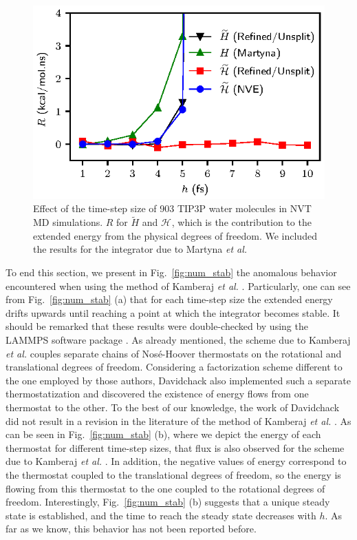 \documentclass[
journal=jctcce,
layout=twocolumn
]{achemso}
\newcommand{\Ham}[1]{{\mathcal H}_\text{#1}}    %
\begin{document}
\begin{figure}
	\includegraphics{Figures/energy_drift.eps}
    \caption{Effect of the time-step size of 903 TIP3P \cite{Jorgensen_1983} water molecules in NVT MD simulations. $R$ for $\widetilde{H}$ and $\Ham{}$, which is the contribution to the extended energy from the physical degrees of freedom. We included the results for the integrator due to Martyna \textit{et al.} \cite{Martyna_1996}
}
	\label{fig:energy_drift}
\end{figure}

To end this section, we present in Fig.~\ref{fig:num_stab} the anomalous behavior encountered when using the method of Kamberaj \textit{et al.} \cite{Kamberaj_2005}.
Particularly, one can see from Fig.~\ref{fig:num_stab} (a) that for each time-step size the extended energy drifts upwards until reaching a point at which the integrator becomes stable.
It should be remarked that these results were double-checked by using the LAMMPS software package \cite{Plimpton_1995}. 
As already mentioned, the scheme due to Kamberaj \textit{et al.} \cite{Kamberaj_2005} couples separate chains of Nos\'{e}-Hoover thermostats on the rotational and translational degrees of freedom.
Considering a factorization scheme different to the one employed by those authors, Davidchack \cite{Davidchack_2009} also implemented such a separate thermostatization and discovered the existence of energy flows from one thermostat to the other.
To the best of our knowledge, the work of Davidchack \cite{Davidchack_2009} did not result in a revision in the literature of the method of Kamberaj \textit{et al.} \cite{Kamberaj_2005}.
As can be seen in Fig.~\ref{fig:num_stab} (b), where we depict the energy of each thermostat for different time-step sizes, that flux is also observed for the scheme due to Kamberaj \textit{et al.} \cite{Kamberaj_2005}.
In addition, the negative values of energy correspond to the thermostat coupled to the translational degrees of freedom, so the energy is flowing from this thermostat to the one coupled to the rotational degrees of freedom.
Interestingly, Fig.~\ref{fig:num_stab} (b) suggests that a unique steady state is established, and the time to reach the steady state decreases with $h$. As far as we know, this behavior has not been reported before.
\end{document}
